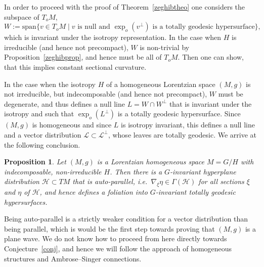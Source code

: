 \documentclass[11pt,a4paper]{amsart}
\newcommand{\+}{\oplus}
\newcommand{\1}{\mathbf{1}}
\newcommand{\<}{\langle}
\renewcommand{\>}{\rangle}
\theoremstyle{definition}
\theoremstyle{plain}
\newtheorem{proposition}[definition]{Proposition}
\numberwithin{equation}{section}
\begin{document}
In order to proceed with the proof of Theorem~\ref{zeghibtheo}
one considers the subspace of $T_oM$,
\[ W:=\mathrm{span}\{v\in T_oM\mid v\text{ is null and $\exp_o(v^\perp)$ is a totally geodesic hypersurface}\},\]
which is invariant under the isotropy representation. In the case when $H$ is irreducible (and hence not precompact),  $W$ is non-trivial  by Proposition~\ref{zeghibprop}, and hence must be all of $T_oM$. Then one can show, \cite[Proposition 3]{zeghib04} that this implies constant sectional curvature. 

In the case when the isotropy $H$ of a homogeneous Lorentzian space $(M,g)$ is not irreducible, but indecomposable (and hence not precompact),  $W$ must be degenerate, and thus defines a null line 
$L=W\cap W^\perp$ that is invariant under the isotropy and such  that $\exp_o(L^\perp )$ is a totally geodesic hypersurface. Since $(M,g)$ is homogeneous and since $L$ is isotropy invariant,  this defines a null line and  a vector distribution $\mathcal L\subset \mathcal L^\perp$, whose leaves are totally geodesic.  
We arrive at the following conclusion.
\begin{proposition}\label{zeghibindecprop}
Let $(M,g)$ is a Lorentzian homogeneous space $M=G/H$ with indecomposable, non-irreducible $H$. Then there is a $G$-invariant hyperplane distribution $\mathcal H\subset TM$ that is
auto-parallel, i.e.~$\nabla_\xi\eta\in \Gamma(\mathcal H)$ for all sections $\xi$ and $\eta$ of $\mathcal H$, and hence defines a foliation into $G$-invariant totally geodesic hypersurfaces.
\end{proposition}
Being auto-parallel  is a strictly weaker condition for a vector distribution than being  parallel, which is would be the first step towards proving that $(M,g)$ is a plane wave. We do not know how to proceed from here directly towards Conjecture~\ref{conj}, and hence we will follow the approach of homogeneous structures and Ambrose--Singer connections.
\end{document}
